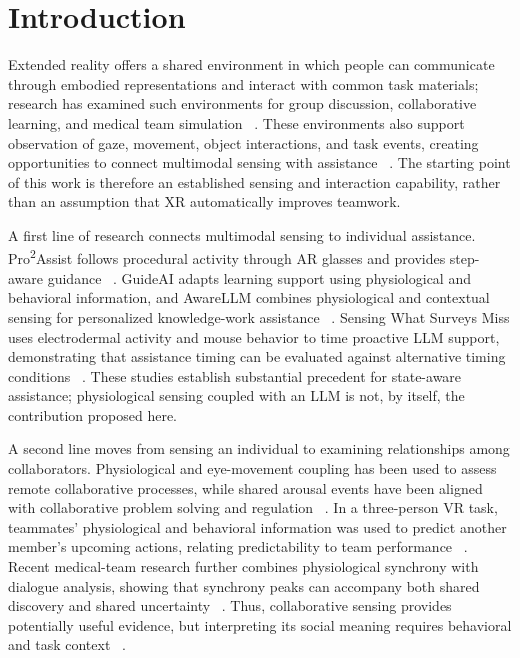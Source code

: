 \section{Introduction}
\label{sec:1}

Extended reality offers a shared environment in which people can communicate through embodied representations and interact with common task materials; research has examined such environments for group discussion, collaborative learning, and medical team simulation ~\cite{p70,p51,p66}. These environments also support observation of gaze, movement, object interactions, and task events, creating opportunities to connect multimodal sensing with assistance ~\cite{p34,p57,pro2}. The starting point of this work is therefore an established sensing and interaction capability, rather than an assumption that XR automatically improves teamwork.

A first line of research connects multimodal sensing to individual assistance. Pro\textsuperscript{2}Assist follows procedural activity through AR glasses and provides step-aware guidance ~\cite{pro2}. GuideAI adapts learning support using physiological and behavioral information, and AwareLLM combines physiological and contextual sensing for personalized knowledge-work assistance ~\cite{guide,aware}. Sensing What Surveys Miss uses electrodermal activity and mouse behavior to time proactive LLM support, demonstrating that assistance timing can be evaluated against alternative timing conditions ~\cite{sensing}. These studies establish substantial precedent for state-aware assistance; physiological sensing coupled with an LLM is not, by itself, the contribution proposed here.

A second line moves from sensing an individual to examining relationships among collaborators. Physiological and eye-movement coupling has been used to assess remote collaborative processes, while shared arousal events have been aligned with collaborative problem solving and regulation ~\cite{p8,p18,p47}. In a three-person VR task, teammates' physiological and behavioral information was used to predict another member's upcoming actions, relating predictability to team performance ~\cite{p52}. Recent medical-team research further combines physiological synchrony with dialogue analysis, showing that synchrony peaks can accompany both shared discovery and shared uncertainty ~\cite{huang}. Thus, collaborative sensing provides potentially useful evidence, but interpreting its social meaning requires behavioral and task context ~\cite{p32,p56}.

